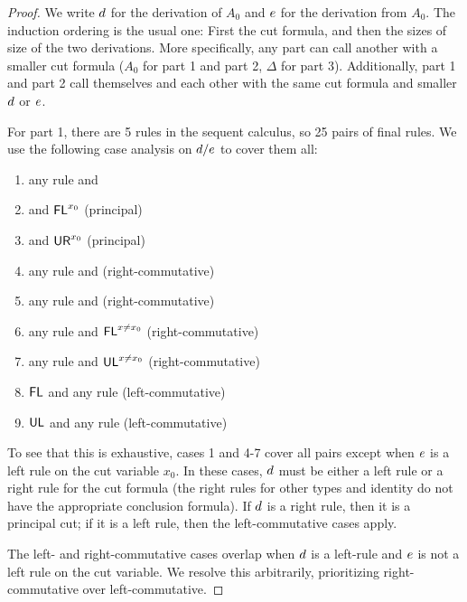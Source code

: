 \begin{proof}
We write $d$ for the derivation of $A_0$ and $e$ for the derivation
from $A_0$.  The induction ordering is the usual one: First the cut
formula, and then the sizes of size of the two derivations.  More
specifically, any part can call another with a smaller cut formula
($A_0$ for part 1 and part 2, $\Delta$ for part 3).  Additionally, part
1 and part 2 call themselves and each other with the same cut formula
and smaller $d$ or $e$.

For part 1, there are 5 rules in the sequent calculus, so 25 pairs of
final rules.  We use the following case analysis on $d/e$ to cover
them all:
\begin{enumerate} 
\item any rule and 
\item \FR\/ and $\mathsf{FL}^{x_0}$ (principal)
\item \UR\/ and $\mathsf{UR}^{x_0}$ (principal)
\item any rule and \FR\/ (right-commutative)
\item any rule and \UR\/ (right-commutative)
\item any rule and $\mathsf{FL}^{x \neq x_0}$ (right-commutative)
\item any rule and $\mathsf{UL}^{x \neq x_0}$ (right-commutative)
\item $\mathsf{FL}$ and any rule (left-commutative)
\item $\mathsf{UL}$ and any rule (left-commutative)
\end{enumerate}
To see that this is exhaustive, cases 1 and 4-7 cover all pairs except
when $e$ is a left rule on the cut variable $x_0$.  In these cases,
$d$ must be either a left rule or a right rule for the cut formula (the
right rules for other types and identity do not have the appropriate
conclusion formula).  If $d$ is a right rule, then it is a principal
cut; if it is a left rule, then the left-commutative cases apply.  

The left- and right-commutative cases overlap when $d$ is a left-rule
and $e$ is not a left rule on the cut variable.  We resolve this
arbitrarily, prioritizing right-commutative over left-commutative.


\end{proof}
